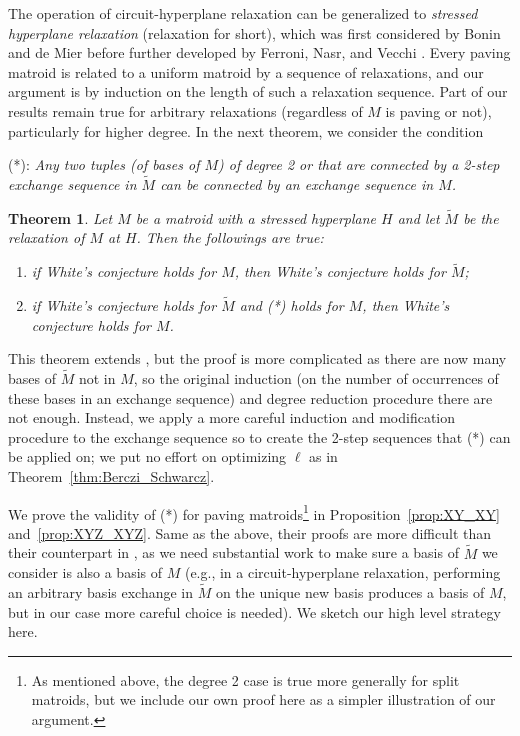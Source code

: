 \documentclass{amsart}
\newtheorem{theorem}{Theorem}[section]
\begin{document}
The operation of circuit-hyperplane relaxation can be generalized to {\em stressed hyperplane relaxation} (relaxation for short), which was first considered by Bonin and de Mier \cite{bonin2008} before further developed by Ferroni, Nasr, and Vecchi \cite{ferroni2023stressed}. Every paving matroid is related to a uniform matroid by a sequence of relaxations, and our argument is by induction on the length of such a relaxation sequence. Part of our results remain true for arbitrary relaxations (regardless of $M$ is paving or not), particularly for higher degree. In the next theorem, we consider the condition 
\begin{center}
    (*): {\em Any two tuples (of bases of $M$) of degree 2\! or that are connected by a 2-step exchange sequence in $\widetilde{M}$ can be connected by an exchange sequence in $M$.}
\end{center}

\begin{theorem} \label{thm:B}
    Let $M$ be a matroid with a stressed hyperplane $H$ and let $\widetilde{M}$ be the relaxation of $M$ at $H$. Then the followings are true:
    \begin{enumerate}
        \item if White's conjecture holds for $M$, then White's conjecture holds for $\widetilde{M}$;
        \item if White's conjecture holds for $\widetilde{M}$ and {\rm (*)} holds for $M$, then White's conjecture holds for $M$.
    \end{enumerate}
\end{theorem}

This theorem extends \cite[Theorem~2.13]{han2025white}, but the proof is more complicated as there are now many bases of $\widetilde{M}$ not in $M$, so the original induction (on the number of occurrences of these bases in an exchange sequence) and degree reduction procedure there are not enough.
Instead, we apply a more careful induction and modification procedure to the exchange sequence so to create the 2-step sequences that (*) can be applied on; we put no effort on optimizing $\ell$ as in Theorem~\ref{thm:Berczi_Schwarcz}. 

We prove the validity of (*) for paving matroids\footnote{As mentioned above, the degree 2 case is true more generally for split matroids, but we include our own proof here as a simpler illustration of our argument.} in Proposition~\ref{prop:XY_XY} and~\ref{prop:XYZ_XYZ}. Same as the above, their proofs are more difficult than their counterpart in \cite{han2025white}, as we need substantial work to make sure a basis of $\widetilde{M}$ we consider is also a basis of $M$ (e.g., in a circuit-hyperplane relaxation, performing an arbitrary basis exchange in $\widetilde{M}$ on the unique new basis produces a basis of $M$, but in our case more careful choice is needed). We sketch our high level strategy here.
\end{document}
